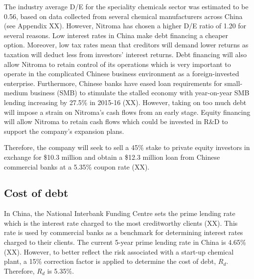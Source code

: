 The industry average D/E for the speciality chemicals sector was estimated to be 0.56, based on data collected from several chemical manufacturers across China (see Appendix XX). However, Nitroma has chosen a higher D/E ratio of 1.20 for several reasons. Low interest rates in China make debt financing a cheaper option. Moreover, low tax rates mean that creditors will demand lower returns as taxation will deduct less from investors’ interest returns. Debt financing will also allow Nitroma to retain control of its operations which is very important to operate in the complicated Chinese business environment as a foreign-invested enterprise. Furthermore, Chinese banks have eased loan requirements for small-medium business (SMB) to stimulate the stalled economy with year-on-year SMB lending increasing by 27.5\% in 2015-16 (XX). However, taking on too much debt will impose a strain on Nitroma’s cash flows from an early stage. Equity financing will allow Nitroma to retain cash flows which could be invested in R\&D to support the company’s expansion plans.

Therefore, the company will seek to sell a 45\% stake to private equity investors in exchange for \$10.3 million and obtain a \$12.3 million loan from Chinese commercial banks at a 5.35\% coupon rate (XX).

\subsection{Cost of debt}
\label{sec:debt}
In China, the National Interbank Funding Centre sets the prime lending rate which is the interest rate charged to the most creditworthy clients (XX). This rate is used by commercial banks as a benchmark for determining interest rates charged to their clients. The current 5-year prime lending rate in China is 4.65\% (XX). However, to better reflect the risk associated with a start-up chemical plant, a 15\% correction factor is applied to determine the cost of debt, $R_{d}$. Therefore, $R_{d}$ is 5.35\%.

